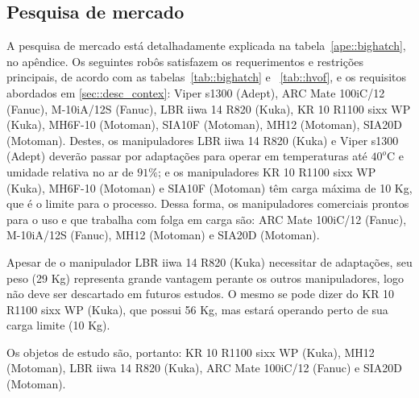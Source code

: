\subsection{Pesquisa de mercado}
A pesquisa de mercado está detalhadamente explicada na
tabela~\ref{ape::bighatch}, no apêndice. Os seguintes robôs satisfazem os
requerimentos e restrições principais, de acordo com as tabelas~\ref{tab::bighatch} e ~\ref{tab::hvof}, e os requisitos abordados
em \ref{sec::desc_contex}: Viper s1300 (Adept), ARC Mate 100iC/12 (Fanuc),
M-10iA/12S (Fanuc), LBR iiwa 14 R820 (Kuka), KR 10 R1100 sixx WP (Kuka), MH6F-10
(Motoman), SIA10F (Motoman), MH12 (Motoman), SIA20D (Motoman). Destes, os
manipuladores LBR iiwa 14 R820 (Kuka) e Viper s1300 (Adept) deverão passar por adaptações para
operar em temperaturas até $40^o$C e umidade relativa no ar de $91\%$; e os
manipuladores KR 10 R1100 sixx WP (Kuka), MH6F-10
(Motoman) e SIA10F (Motoman) têm carga máxima de 10 Kg, que é o limite para o
processo. Dessa forma, os manipuladores comerciais prontos para o uso e que
trabalha com folga em carga são: ARC Mate 100iC/12 (Fanuc), M-10iA/12S (Fanuc),
MH12 (Motoman) e SIA20D (Motoman).

Apesar de o manipulador LBR iiwa 14 R820 (Kuka) necessitar de adaptações, seu
peso (29 Kg) representa grande vantagem perante os outros manipuladores, logo
não deve ser descartado em futuros estudos. O mesmo se pode dizer do KR 10 R1100
sixx WP (Kuka), que possui 56 Kg, mas estará operando perto de sua carga limite
(10 Kg).

Os objetos de estudo são, portanto: KR 10 R1100
sixx WP (Kuka), MH12 (Motoman), LBR iiwa 14 R820 (Kuka), ARC Mate 100iC/12
(Fanuc) e SIA20D (Motoman).

